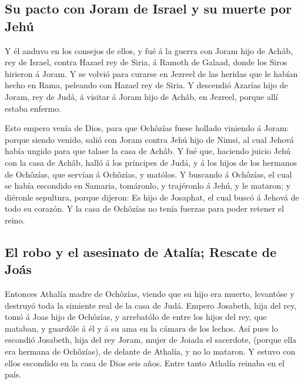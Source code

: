 \hypertarget{su-pacto-con-joram-de-israel-y-su-muerte-por-jehuxfa}{%
\subsection{Su pacto con Joram de Israel y su muerte por
Jehú}\label{su-pacto-con-joram-de-israel-y-su-muerte-por-jehuxfa}}

 Y él anduvo en los consejos de ellos, y fué á la guerra
con Joram hijo de Achâb, rey de Israel, contra Hazael rey de Siria, á
Ramoth de Galaad, donde los Siros hirieron á Joram.  Y se
volvió para curarse en Jezreel de las heridas que le habían hecho en
Rama, peleando con Hazael rey de Siria. Y descendió Azarías hijo de
Joram, rey de Judá, á visitar á Joram hijo de Achâb, en Jezreel, porque
allí estaba enfermo.

 Esto empero venía de Dios, para que Ochôzías fuese
hollado viniendo á Joram: porque siendo venido, salió con Joram contra
Jehú hijo de Nimsi, al cual Jehová había ungido para que talase la casa
de Achâb.  Y fué que, haciendo juicio Jehú con la casa de
Achâb, halló á los príncipes de Judá, y á los hijos de los hermanos de
Ochôzías, que servían á Ochôzías, y matólos.  Y buscando á
Ochôzías, el cual se había escondido en Samaria, tomáronlo, y trajéronlo
á Jehú, y le mataron; y diéronle sepultura, porque dijeron: Es hijo de
Josaphat, el cual buscó á Jehová de todo su corazón. Y la casa de
Ochôzías no tenía fuerzas para poder retener el reino.

\hypertarget{el-robo-y-el-asesinato-de-ataluxeda-rescate-de-jouxe1s}{%
\subsection{El robo y el asesinato de Atalía; Rescate de
Joás}\label{el-robo-y-el-asesinato-de-ataluxeda-rescate-de-jouxe1s}}

 Entonces Athalía madre de Ochôzías, viendo que su hijo
era muerto, levantóse y destruyó toda la simiente real de la casa de
Judá.  Empero Josabeth, hija del rey, tomó á Joas hijo de
Ochôzías, y arrebatólo de entre los hijos del rey, que mataban, y
guardóle á él y á su ama en la cámara de los lechos. Así pues lo
escondió Josabeth, hija del rey Joram, mujer de Joiada el sacerdote,
(porque ella era hermana de Ochôzías), de delante de Athalía, y no lo
mataron.  Y estuvo con ellos escondido en la casa de Dios
seis años. Entre tanto Athalía reinaba en el país.

